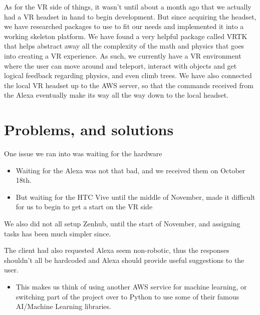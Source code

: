 \documentclass[onecolumn, draftclsnofoot,10pt, compsoc]{IEEEtran}
\begin{document}
    \vspace{10pt}
    
    As for the VR side of things, it wasn{'}t until about a month ago that we actually had a VR headset in hand to begin development. But since acquiring the headset, we have researched packages to use to fit our needs and implemented it into a working skeleton platform. We have found a very helpful package called VRTK that helps abstract away all the complexity of the math and physics that goes into creating a VR experience. As such, we currently have a VR environment where the user can move around and teleport, interact with objects and get logical feedback regarding physics, and even climb trees. We have also connected the local VR headset up to the AWS server, so that the commands received from the Alexa eventually make its way all the way down to the local headset. 


\section{Problems, and solutions}

    One issue we ran into was waiting for the hardware 
    \begin{itemize}
        \item Waiting for the Alexa was not that bad, and we received them on October 18th.  
        \item But waiting for the HTC Vive until the middle of November, made it difficult for us to begin to get a start on the VR side 
    \end{itemize}
    
    \vspace{10pt}
    
    We also did not all setup Zenhub, until the start of November, and assigning tasks has been much simpler since.
    
    \vspace{10pt}
    
    The client had also requested Alexa seem non-robotic, thus the responses shouldn{'}t all be hardcoded and Alexa should provide useful suggestions to the user. 
    
    \begin{itemize}
        \item This makes us think of using another AWS service for machine learning, or switching part of the project over to Python to use some of their famous AI/Machine Learning libraries.
    \end{itemize}
    
\end{document}
